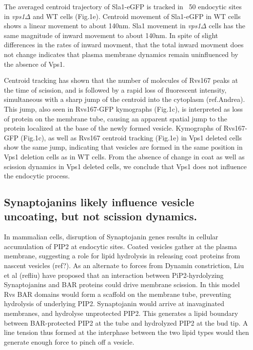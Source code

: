 \documentclass[9pt,lineno]{elife}
\begin{document}
The averaged centroid trajectory of Sla1-eGFP is tracked in ~50 endocytic sites in \textit{vps1$\Delta$} and WT cells (Fig.1e). Centroid movement of Sla1-eGFP in WT cells shows a linear movement to about 140nm. Sla1 movement in \textit{vps1$\Delta$} cells has the same magnitude of inward movement to about 140nm. In spite of slight differences in the rates of inward movment, that the total inward movment does not change indicates that plasma membrane dynamics remain uninfluenced by the absence of Vps1. 

Centroid tracking has shown that the number of molecules of Rvs167 peaks at the time of scission, and is followed by a rapid loss of fluorescent intensity, simultaneous with a sharp jump of the centroid into the cytoplasm (ref.Andrea). This jump, also seen in Rvs167-GFP kymographs (Fig.1c), is interpreted as loss of protein on the membrane tube, causing an apparent spatial jump to the protein localized at the base of the newly formed vesicle. Kymographs of Rvs167-GFP (Fig.1c), as well as Rvs167 centroid tracking (Fig.1e) in Vps1 deleted cells show the same jump, indicating that vesicles are formed in the same position in Vps1 deletion cells as in WT cells. From the absence of change in coat as well as scission dynamics in Vps1 deleted cells, we conclude that Vps1 does not influence the endocytic process.




\subsection{Synaptojanins likely influence vesicle uncoating, but not scission dynamics.}

In mammalian cells, disruption of Synaptojanin genes results in cellular accumulation of PIP2 at endocytic sites. Coated vesicles gather at the plasma membrane, suggesting a role for lipid hydrolysis in releasing coat proteins from nascent vesicles (ref?). As an alternate to forces from Dynamin constriction, Liu et al (refliu) have proposed that an interaction between PiP2-hyrdolyzing Synaptojanins and BAR proteins could drive membrane scission. In this model Rvs BAR domains would form a scaffold on the membrane tube, preventing hydrolysis of underlying PIP2. Synaptojanin would arrive at inavaginated membranes, and hydrolyse unprotected PIP2. This generates a lipid boundary between BAR-protected PIP2 at the tube and hydrolyzed PIP2 at the bud tip. A line tension thus formed at the interphase between the two lipid types would then generate enough force to pinch off a vesicle.
\end{document}
